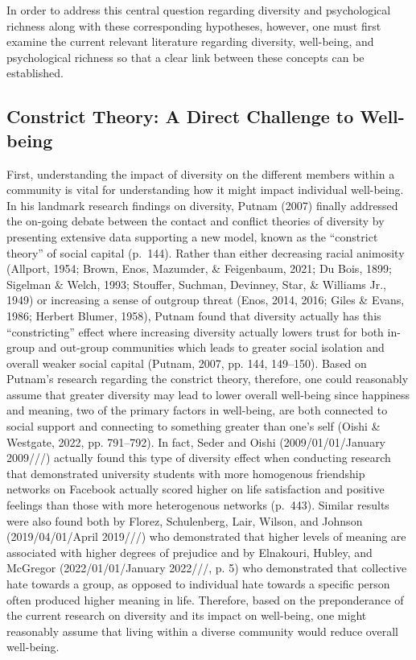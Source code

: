 \documentclass[
  man]{apa6}
\begin{document}
In order to address this central question regarding diversity and psychological richness along with these corresponding hypotheses, however, one must first examine the current relevant literature regarding diversity, well-being, and psychological richness so that a clear link between these concepts can be established.

\hypertarget{constrict-theory-a-direct-challenge-to-well-being}{%
\subsection{Constrict Theory: A Direct Challenge to Well-being}\label{constrict-theory-a-direct-challenge-to-well-being}}

First, understanding the impact of diversity on the different members within a community is vital for understanding how it might impact individual well-being. In his landmark research findings on diversity,
Putnam (2007) finally addressed the on-going debate between the contact and conflict theories of diversity by presenting extensive data supporting a new model, known as the ``constrict theory'' of social capital (p.~144). Rather than either decreasing racial animosity (Allport, 1954; Brown, Enos, Mazumder, \& Feigenbaum, 2021; Du Bois, 1899; Sigelman \& Welch, 1993; Stouffer, Suchman, Devinney, Star, \& Williams Jr., 1949) or increasing a sense of outgroup threat (Enos, 2014, 2016; Giles \& Evans, 1986; Herbert Blumer, 1958), Putnam found that diversity actually has this ``constricting'' effect where increasing diversity actually lowers trust for both in-group and out-group communities which leads to greater social isolation and overall weaker social capital (Putnam, 2007, pp. 144, 149--150). Based on Putnam's research regarding the constrict theory, therefore, one could reasonably assume that greater diversity may lead to lower overall well-being since happiness and meaning, two of the primary factors in well-being, are both connected to social support and connecting to something greater than one's self (Oishi \& Westgate, 2022, pp. 791--792). In fact, Seder and Oishi (2009/01/01/January 2009///) actually found this type of diversity effect when conducting research that demonstrated university students with more homogenous friendship networks on Facebook actually scored higher on life satisfaction and positive feelings than those with more heterogenous networks (p.~443). Similar results were also found both by Florez, Schulenberg, Lair, Wilson, and Johnson (2019/04/01/April 2019///) who demonstrated that higher levels of meaning are associated with higher degrees of prejudice and by Elnakouri, Hubley, and McGregor (2022/01/01/January 2022///, p. 5) who demonstrated that collective hate towards a group, as opposed to individual hate towards a specific person often produced higher meaning in life. Therefore, based on the preponderance of the current research on diversity and its impact on well-being, one might reasonably assume that living within a diverse community would reduce overall well-being.
\end{document}
